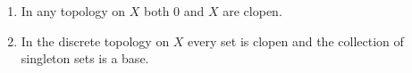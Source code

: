 \begin{enumerate}
\item In any topology on $X$ both $0$ and $X$ are clopen.
\item In the discrete topology on $X$ every set is clopen and the collection of singleton sets is a base.
\end{enumerate}
